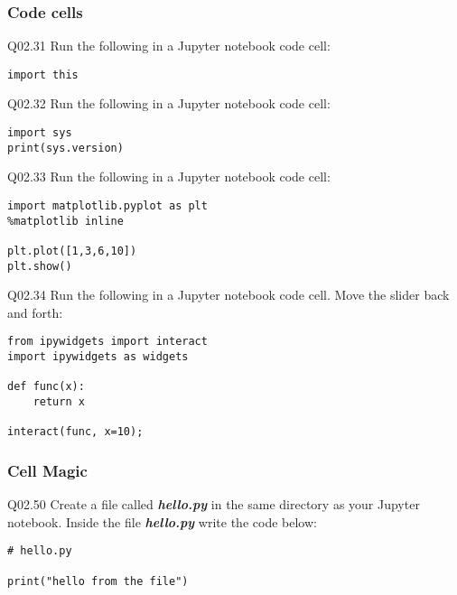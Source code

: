\documentclass{book}
\newenvironment{problems}{}{}  %
\begin{document}
    
        \begin{problems}
        \hypertarget{code-cells}{%
\subsubsection{Code cells}\label{code-cells}}

Q02.31 Run the following in a Jupyter notebook code cell:

\begin{lstlisting}
import this
\end{lstlisting}

Q02.32 Run the following in a Jupyter notebook code cell:

\begin{lstlisting}
import sys
print(sys.version)
\end{lstlisting}

Q02.33 Run the following in a Jupyter notebook code cell:

\begin{lstlisting}
import matplotlib.pyplot as plt
%matplotlib inline

plt.plot([1,3,6,10])
plt.show()
\end{lstlisting}

Q02.34 Run the following in a Jupyter notebook code cell. Move the
slider back and forth:

\begin{lstlisting}
from ipywidgets import interact
import ipywidgets as widgets

def func(x):
    return x
    
interact(func, x=10);
\end{lstlisting}
        \end{problems}

    




    
        \hypertarget{cell-magic}{%
\subsubsection{Cell Magic}\label{cell-magic}}

Q02.50 Create a file called \textbf{\emph{hello.py}} in the same
directory as your Jupyter notebook. Inside the file
\textbf{\emph{hello.py}} write the code below:

\begin{lstlisting}
# hello.py

print("hello from the file")
\end{lstlisting}
\end{document}
